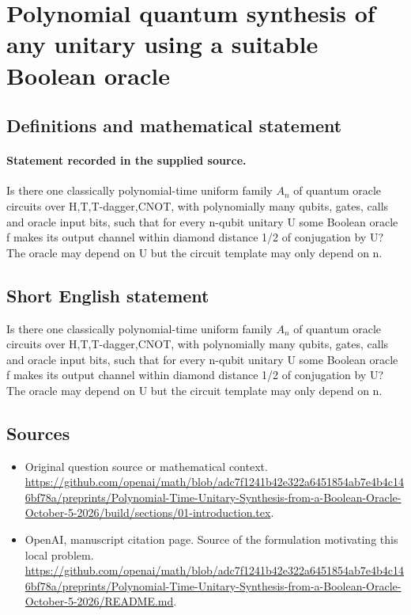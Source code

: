 \documentclass[11pt]{article}
\begin{document}
\section*{Polynomial quantum synthesis of any unitary using a suitable Boolean oracle}\label{statement}
\subsection{Definitions and mathematical statement}
\paragraph{Statement recorded in the supplied source.}
Is there one classically polynomial-time uniform family $A_n$ of quantum oracle circuits over H,T,T-dagger,CNOT, with polynomially many qubits, gates, calls and oracle input bits, such that for every n-qubit unitary U some Boolean oracle f makes its output channel within diamond distance 1/2 of conjugation by U? The oracle may depend on U but the circuit template may only depend on n.
\subsection{Short English statement}
Is there one classically polynomial-time uniform family $A_n$ of quantum oracle circuits over H,T,T-dagger,CNOT, with polynomially many qubits, gates, calls and oracle input bits, such that for every n-qubit unitary U some Boolean oracle f makes its output channel within diamond distance 1/2 of conjugation by U? The oracle may depend on U but the circuit template may only depend on n.
\subsection{Sources}
\begin{itemize}
\item[S1] Original question source or mathematical context.
\url{https://github.com/openai/math/blob/adc7f1241b42e322a6451854ab7e4b4c146bf78a/preprints/Polynomial-Time-Unitary-Synthesis-from-a-Boolean-Oracle-October-5-2026/build/sections/01-introduction.tex}.
\item[S2] OpenAI, manuscript citation page. Source of the formulation motivating this local problem.
\url{https://github.com/openai/math/blob/adc7f1241b42e322a6451854ab7e4b4c146bf78a/preprints/Polynomial-Time-Unitary-Synthesis-from-a-Boolean-Oracle-October-5-2026/README.md}.
\end{itemize}
\end{document}
